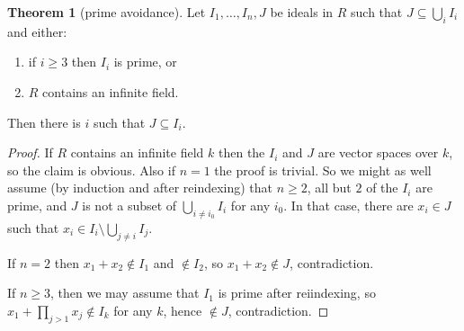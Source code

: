 \documentclass[12pt]{book}
\theoremstyle{definition}
\newtheorem{theorem}{Theorem}[chapter]
\begin{document}
\begin{theorem}[prime avoidance]
Let $I_1, \dots, I_n, J$ be ideals in $R$ such that $J \subseteq \bigcup_i I_i$ and either:
\begin{enumerate}
\item if $i \geq 3$ then $I_i$ is prime, or
\item $R$ contains an infinite field.
\end{enumerate}
Then there is $i$ such that $J \subseteq I_i$.
\end{theorem}
\begin{proof}
If $R$ contains an infinite field $k$ then the $I_i$ and $J$ are vector spaces over $k$, so the claim is obvious.
Also if $n = 1$ the proof is trivial.
So we might as well assume (by induction and after reindexing) that $n \geq 2$, all but $2$ of the $I_i$ are prime, and $J$ is not a subset of $\bigcup_{i \neq i_0} I_i$ for any $i_0$.
In that case, there are $x_i \in J$ such that $x_i \in I_i \setminus \bigcup_{j \neq i} I_j$.

If $n = 2$ then $x_1 + x_2 \notin I_1$ and $\notin I_2$, so $x_1 + x_2 \notin J$, contradiction.

If $n \geq 3$, then we may assume that $I_1$ is prime after reiindexing, so $x_1 + \prod_{j > 1} x_j \notin I_k$ for any $k$, hence $\notin J$, contradiction.
\end{proof}





\newpage
\printindex
\printbibliography
\end{document}
